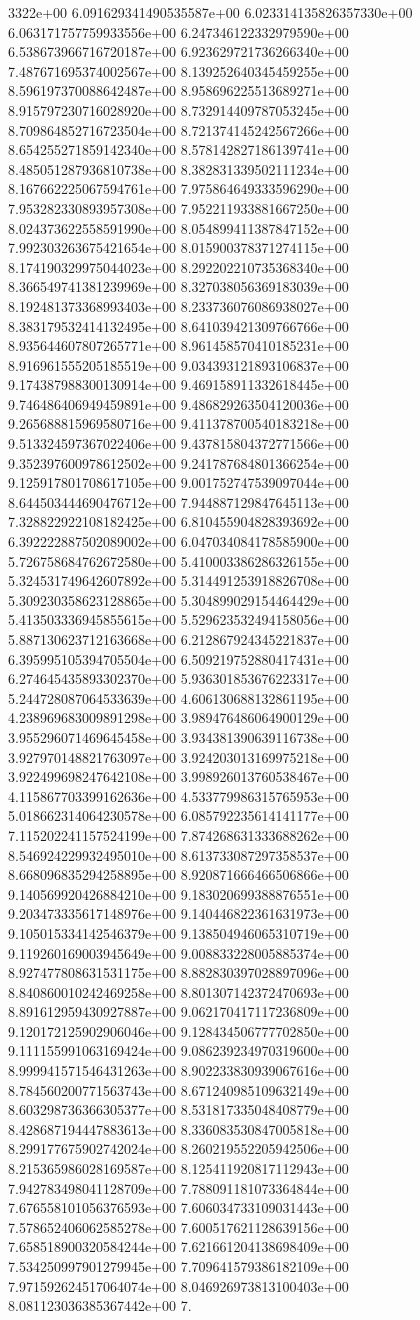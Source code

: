 3322e+00	6.091629341490535587e+00	6.023314135826357330e+00	6.063171757759933556e+00	6.247346122332979590e+00	6.538673966716720187e+00	6.923629721736266340e+00	7.487671695374002567e+00	8.139252640345459255e+00	8.596197370088642487e+00	8.958696225513689271e+00	8.915797230716028920e+00	8.732914409787053245e+00	8.709864852716723504e+00	8.721374145242567266e+00	8.654255271859142340e+00	8.578142827186139741e+00	8.485051287936810738e+00	8.382831339502111234e+00	8.167662225067594761e+00	7.975864649333596290e+00	7.953282330893957308e+00	7.952211933881667250e+00	8.024373622558591990e+00	8.054899411387847152e+00	7.992303263675421654e+00	8.015900378371274115e+00	8.174190329975044023e+00	8.292202210735368340e+00	8.366549741381239969e+00	8.327038056369183039e+00	8.192481373368993403e+00	8.233736076086938027e+00	8.383179532414132495e+00	8.641039421309766766e+00	8.935644607807265771e+00	8.961458570410185231e+00	8.916961555205185519e+00	9.034393121893106837e+00	9.174387988300130914e+00	9.469158911332618445e+00	9.746486406949459891e+00	9.486829263504120036e+00	9.265688815969580716e+00	9.411378700540183218e+00	9.513324597367022406e+00	9.437815804372771566e+00	9.352397600978612502e+00	9.241787684801366254e+00	9.125917801708617105e+00	9.001752747539097044e+00	8.644503444690476712e+00	7.944887129847645113e+00	7.328822922108182425e+00	6.810455904828393692e+00	6.392222887502089002e+00	6.047034084178585900e+00	5.726758684762672580e+00	5.410003386286326155e+00	5.324531749642607892e+00	5.314491253918826708e+00	5.309230358623128865e+00	5.304899029154464429e+00	5.413503336945855615e+00	5.529623532494158056e+00	5.887130623712163668e+00	6.212867924345221837e+00	6.395995105394705504e+00	6.509219752880417431e+00	6.274645435893302370e+00	5.936301853676223317e+00	5.244728087064533639e+00	4.606130688132861195e+00	4.238969683009891298e+00	3.989476486064900129e+00	3.955296071469645458e+00	3.934381390639116738e+00	3.927970148821763097e+00	3.924203013169975218e+00	3.922499698247642108e+00	3.998926013760538467e+00	4.115867703399162636e+00	4.533779986315765953e+00	5.018662314064230578e+00	6.085792235614141177e+00	7.115202241157524199e+00	7.874268631333688262e+00	8.546924229932495010e+00	8.613733087297358537e+00	8.668096835294258895e+00	8.920871666466506866e+00	9.140569920426884210e+00	9.183020699388876551e+00	9.203473335617148976e+00	9.140446822361631973e+00	9.105015334142546379e+00	9.138504946065310719e+00	9.119260169003945649e+00	9.008833228005885374e+00	8.927477808631531175e+00	8.882830397028897096e+00	8.840860010242469258e+00	8.801307142372470693e+00	8.891612959430927887e+00	9.062170417117236809e+00	9.120172125902906046e+00	9.128434506777702850e+00	9.111155991063169424e+00	9.086239234970319600e+00	8.999941571546431263e+00	8.902233830939067616e+00	8.784560200771563743e+00	8.671240985109632149e+00	8.603298736366305377e+00	8.531817335048408779e+00	8.428687194447883613e+00	8.336083530847005818e+00	8.299177675902742024e+00	8.260219552205942506e+00	8.215365986028169587e+00	8.125411920817112943e+00	7.942783498041128709e+00	7.788091181073364844e+00	7.676558101056376593e+00	7.606034733109031443e+00	7.578652406062585278e+00	7.600517621128639156e+00	7.658518900320584244e+00	7.621661204138698409e+00	7.534250997901279945e+00	7.709641579386182109e+00	7.971592624517064074e+00	8.046926973813100403e+00	8.081123036385367442e+00	7.